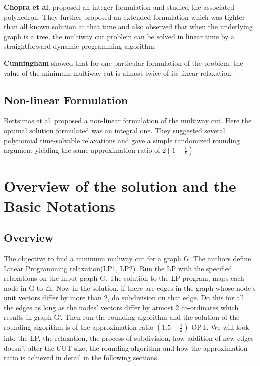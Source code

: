 \documentclass[11pt]{article}
\begin{document}
\textbf{Chopra et al.} proposed an integer formulation and studied the associated polyhedron. They further proposed an extended formulation  which was tighter than all known solution at that time and also observed that when the underlying graph is a tree, the multiway cut problem can be solved in linear time by a straightforward dynamic programming algorithm.

\textbf{Cunningham} showed that for one particular formulation of the problem, the value of the minimum multiway cut is almost twice of its linear relaxation.

\subsection{Non-linear Formulation}
Bertsimas et al.\cite{Bertsimas} proposed a non-linear formulation of the multiway cut. Here the optimal solution formulated was an integral one. They suggested several polynomial time-solvable relaxations and gave a simple randomized rounding argument yielding the same approximation ratio of $2(1 - \frac{1}{k})$

\section{Overview of the solution and the Basic Notations}
\subsection{Overview}
The objective to find a minimum muliway cut for a graph G. The authors define Linear Programming relaxation(LP1, LP2). Run the LP with the specified relaxations on the input graph G. The solution to the LP program, maps each node in G to $\bigtriangleup$. Now in the solution, if there are edges in the graph whose node's unit vectors differ by more than 2, do subdivision on that edge. Do this for all the edges as long as the nodes' vectors differ by atmost 2 co-ordinates which results in graph G'. Then run the rounding algorithm and the solution of the rounding algorithm is of the approximation ratio $(1.5 - \frac{1}{k})$ OPT. We will look into the LP, the relaxation, the process of subdivision, how addition of new edges doesn't alter the CUT size, the rounding algorithm and how the approximation ratio is achieved in detail in the following sections.
\end{document}
